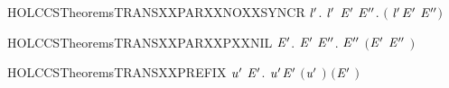 \begin{SaveVerbatim}{HOLCCSTheoremsTRANSXXPARXXNOXXSYNCR}
\HOLTokenTurnstile{} \HOLSymConst{\HOLTokenForall{}} \ensuremath{\HOLBoundVar{l}\sp{\prime{}}}.
      \HOLSymConst{\HOLTokenNotEqual{}}  \ensuremath{\HOLBoundVar{l}\sp{\prime{}}} \HOLSymConst{\HOLTokenImp{}}
     \HOLSymConst{\HOLTokenForall{}} \ensuremath{\HOLBoundVar{E}\sp{\prime{}}} \ensuremath{\HOLBoundVar{E}\sp{\prime{}\prime{}}}. \HOLSymConst{\HOLTokenNeg{}}\ensuremath{(} \HOLSymConst{\ensuremath{\ldotp}} \HOLSymConst{\ensuremath{\mid}}  \ensuremath{\HOLBoundVar{l}\sp{\prime{}}}\HOLSymConst{\ensuremath{\ldotp}}\ensuremath{\HOLBoundVar{E}\sp{\prime{}}} \HOLTokenTransBegin\HOLConst{\ensuremath{\tau}}\HOLTokenTransEnd \ensuremath{\HOLBoundVar{E}\sp{\prime{}\prime{}}}\ensuremath{)}
\end{SaveVerbatim}
\newcommand{\HOLCCSTheoremsTRANSXXPARXXNOXXSYNCR}{\UseVerbatim{HOLCCSTheoremsTRANSXXPARXXNOXXSYNCR}}
\begin{SaveVerbatim}{HOLCCSTheoremsTRANSXXPARXXPXXNIL}
\HOLTokenTurnstile{} \HOLSymConst{\HOLTokenForall{}}  \ensuremath{\HOLBoundVar{E}\sp{\prime{}}}.  \HOLSymConst{\ensuremath{\mid}}  \HOLTokenTransBegin{}\HOLTokenTransEnd \ensuremath{\HOLBoundVar{E}\sp{\prime{}}} \HOLSymConst{\HOLTokenImp{}} \HOLSymConst{\HOLTokenExists{}}\ensuremath{\HOLBoundVar{E}\sp{\prime{}\prime{}}}.  \HOLTokenTransBegin{}\HOLTokenTransEnd \ensuremath{\HOLBoundVar{E}\sp{\prime{}\prime{}}} \HOLSymConst{\HOLTokenConj{}} \ensuremath{(}\ensuremath{\HOLBoundVar{E}\sp{\prime{}}} \HOLSymConst{\ensuremath{=}} \ensuremath{\HOLBoundVar{E}\sp{\prime{}\prime{}}} \HOLSymConst{\ensuremath{\mid}} \ensuremath{)}
\end{SaveVerbatim}
\newcommand{\HOLCCSTheoremsTRANSXXPARXXPXXNIL}{\UseVerbatim{HOLCCSTheoremsTRANSXXPARXXPXXNIL}}
\begin{SaveVerbatim}{HOLCCSTheoremsTRANSXXPREFIX}
\HOLTokenTurnstile{} \HOLSymConst{\HOLTokenForall{}}  \ensuremath{\HOLBoundVar{u}\sp{\prime{}}} \ensuremath{\HOLBoundVar{E}\sp{\prime{}}}. \HOLSymConst{\ensuremath{\ldotp}} \HOLTokenTransBegin\ensuremath{\HOLBoundVar{u}\sp{\prime{}}}\HOLTokenTransEnd \ensuremath{\HOLBoundVar{E}\sp{\prime{}}} \HOLSymConst{\HOLTokenImp{}} \ensuremath{(}\ensuremath{\HOLBoundVar{u}\sp{\prime{}}} \HOLSymConst{\ensuremath{=}} \ensuremath{)} \HOLSymConst{\HOLTokenConj{}} \ensuremath{(}\ensuremath{\HOLBoundVar{E}\sp{\prime{}}} \HOLSymConst{\ensuremath{=}} \ensuremath{)}
\end{SaveVerbatim}
